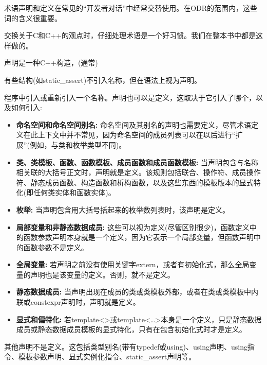 术语声明和定义在常见的“开发者对话”中经常交替使用。在ODR的范围内，这些词的含义很重要。

\begin{notice}交换关于C和C++的观点时，仔细处理术语是一个好习惯。我们在整本书中都是这样做的。
\end{notice}

声明是一种C++构造，(通常)

\begin{notice}有些结构(如static\_assert)不引入名称，但在语法上视为声明。
\end{notice}

程序中引入或重新引入一个名称。声明也可以是定义，这取决于它引入了哪个，以及如何引入:

\begin{itemize}
\item 
\textbf{命名空间和命名空间别名:}
命名空间及其别名的声明也需要定义，尽管术语定义在此上下文中并不常见，因为命名空间的成员列表可以在以后进行“扩展”(例如，与类和枚举类型不同)。

\item 
\textbf{类、类模板、函数、函数模板、成员函数和成员函数模板: }
当声明包含与名称相关联的大括号正文时，声明就是定义。该规则包括联合、操作符、成员操作符、静态成员函数、构造函数和析构函数，以及这些东西的模板版本的显式特化(即任何类实体和函数实体)。

\item 
\textbf{枚举:}
当声明包含用大括号括起来的枚举数列表时，该声明是定义。

\item 
\textbf{局部变量和非静态数据成员:}
这些可以视为定义(尽管区别很少)，函数定义中的函数参数声明本身就是一个定义，因为它表示一个局部变量，但函数声明中的函数参数不是定义。

\item 
\textbf{全局变量:}
若声明之前没有使用关键字extern，或者有初始化式，那么全局变量的声明也是该变量的定义。否则，就不是定义。

\item 
\textbf{静态数据成员: }
当声明出现在成员的类或类模板外部，或者在类或类模板中内联或constexpr声明时，声明就是定义。

\item 
\textbf{显式和偏特化:}
若template<>或template<…>本身是一个定义，只是静态数据成员或静态数据成员模板的显式特化，只有在包含初始化式时才是定义。

\end{itemize}

其他声明不是定义。这包括类型别名(带有typedef或using)、using声明、using指令、模板参数声明、显式实例化指令、static\_assert声明等。






